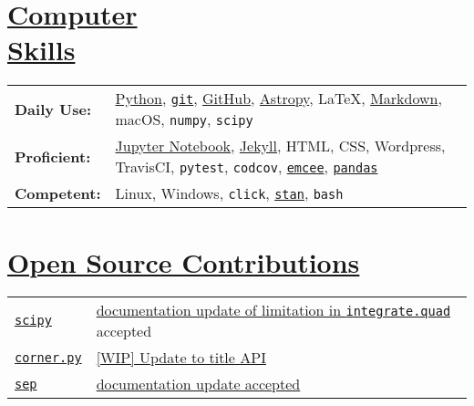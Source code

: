 \documentclass[margin]{res}
\begin{document}
\begin{resume}
\section{\href{https://github.com/benjaminrose}{Computer \\Skills}}
 \hspace{-1em}
 \begin{tabular}{l p{4.5in}}
{\bf Daily Use:} & \href{https://www.python.org}{Python}, \href{https://git-scm.com}{\texttt{git}}, \href{https://github.com/benjaminrose}{GitHub}, \href{http://www.astropy.org}{Astropy}, \LaTeX, \href{http://daringfireball.net/projects/markdown/}{Markdown}, macOS, \texttt{numpy}, \texttt{scipy}\\
{\bf Proficient:} &  \href{http://jupyter.org}{Jupyter Notebook}, \href{https://jekyllrb.com}{Jekyll}, HTML, CSS, Wordpress, TravisCI, \texttt{pytest}, \texttt{codcov}, \href{http://dan.iel.fm/emcee/current/}{\texttt{emcee}}, \href{http://pandas.pydata.org}{\texttt{pandas}}\\
{\bf Competent:} & Linux, Windows, \texttt{click}, \href{http://mc-stan.org}{\texttt{stan}}, \texttt{bash} %
\end{tabular}









\section{\href{https://github.com/benjaminrose}{Open Source Contributions}}
\hspace{-1em}
\begin{tabular}{l p{4.9in}}
\href{https://www.scipy.org}{\texttt{scipy}} & \href{https://github.com/scipy/scipy/pull/8011}{documentation update of limitation in \texttt{integrate.quad}} accepted\\

\href{https://www.scipy.org}{\texttt{corner.py}} & \href{https://github.com/scipy/scipy/pull/8011}{[WIP] Update to title API}\\

\href{http://sep.readthedocs.io/en/v1.0.x/}{\texttt{sep}} & \href{https://github.com/kbarbary/sep/commit/612033788bcce44f110a87e1b54bb70eea9960c2}{documentation update accepted} \\


\end{tabular}
\end{resume}
\end{document}
